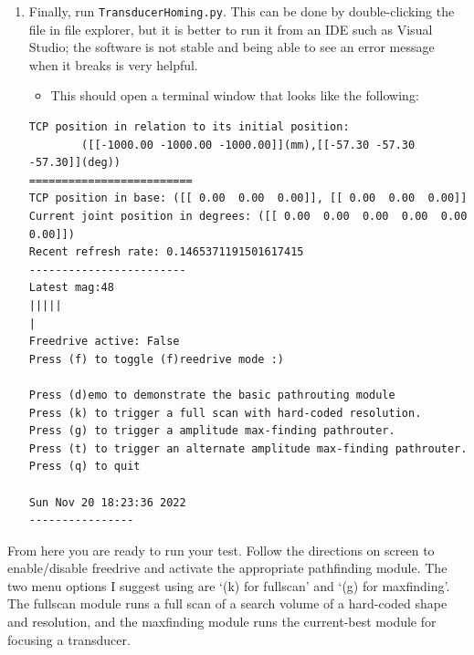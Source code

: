 \documentclass[11pt]{article}
\begin{document}
\begin{enumerate}
    \item Finally, run \texttt{TransducerHoming.py}. This can be done by double-clicking the file in file explorer, but it is better to run it from an IDE such as Visual Studio; the software is not stable and being able to see an error message when it breaks is very helpful.
    \begin{itemize}
        \item This should open a terminal window that looks like the following:
    \end{itemize}
\begin{verbatim}
TCP position in relation to its initial position:
        ([[-1000.00 -1000.00 -1000.00]](mm),[[-57.30 -57.30 -57.30]](deg))
=========================
TCP position in base: ([[ 0.00  0.00  0.00]], [[ 0.00  0.00  0.00]]
Current joint position in degrees: ([[ 0.00  0.00  0.00  0.00  0.00  0.00]])
Recent refresh rate: 0.1465371191501617415
------------------------
Latest mag:48
|||||                                                                      |
Freedrive active: False
Press (f) to toggle (f)reedrive mode :)

Press (d)emo to demonstrate the basic pathrouting module
Press (k) to trigger a full scan with hard-coded resolution.
Press (g) to trigger a amplitude max-finding pathrouter.
Press (t) to trigger an alternate amplitude max-finding pathrouter.
Press (q) to quit

Sun Nov 20 18:23:36 2022
----------------
\end{verbatim}
\end{enumerate}

From here you are ready to run your test. Follow the directions on screen to enable/disable freedrive and activate the appropriate pathfinding module. The two menu options I suggest using are `(k) for fullscan' and `(g) for maxfinding'. The fullscan module runs a full scan of a search volume of a hard-coded shape and resolution, and the maxfinding module runs the current-best module for focusing a transducer.
\end{document}
